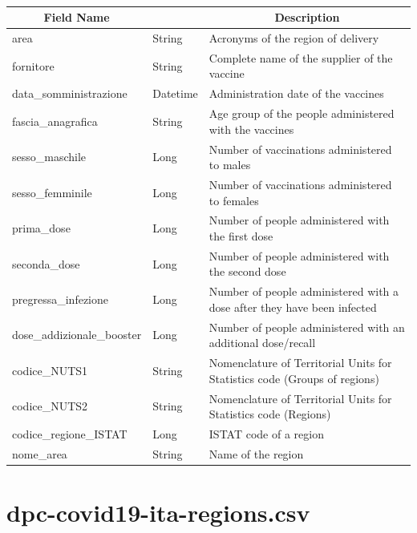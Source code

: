 \documentclass[a4paper,12pt]{article}
\begin{document}
\paragraph{}
\begin{center}
\begin{tabular}{|m{45mm}|>{\raggedright}m{16mm}|m{75mm}|}
\hline
\multicolumn{1}{|c|}{\textbf{ Field Name }}
& \multicolumn{1}{c|}{\textbf{ Data Type }} 
    	& \multicolumn{1}{c|}{\textbf{ Description }}\\
\hline
area & String & Acronyms of the region of delivery \\
\hline
fornitore & String & Complete name of the supplier of the vaccine \\
\hline
data\_somministrazione & Datetime & Administration date of the vaccines \\
\hline
fascia\_anagrafica & String & Age group of the people administered with the vaccines \\
\hline
sesso\_maschile & Long & Number of vaccinations administered to males \\
\hline
sesso\_femminile & Long & Number of vaccinations administered to females \\
\hline
prima\_dose & Long & Number of people administered with the first dose \\
\hline
seconda\_dose & Long & Number of people administered with the second dose \\
\hline
pregressa\_infezione & Long & Number of people administered with a dose after they have
been infected \\
\hline
dose\_addizionale\_booster & Long & Number of people administered with an additional dose/recall \\
\hline
codice\_NUTS1 & String & Nomenclature of Territorial Units for Statistics code (Groups of regions) \\
\hline
codice\_NUTS2 & String & Nomenclature of Territorial Units for Statistics code (Regions) \\
\hline
codice\_regione\_ISTAT & Long & ISTAT code of a region \\
\hline
nome\_area & String & Name of the region \\
\hline
\end{tabular}
\end{center}
\newpage

\section{dpc-covid19-ita-regions.csv}
\end{document}
